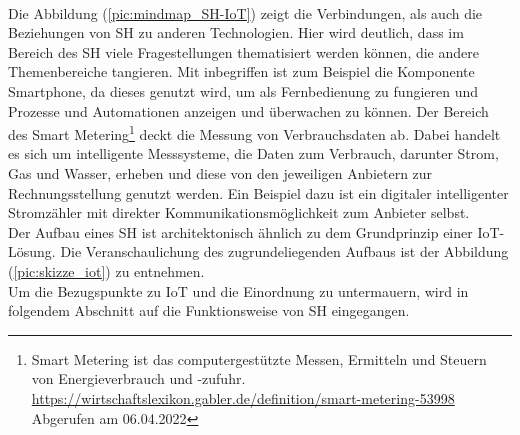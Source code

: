         \\
        Die Abbildung (\ref{pic:mindmap_SH-IoT}) zeigt die Verbindungen, als auch die Beziehungen von \acl{SH} 
        zu anderen Technologien. Hier wird deutlich, dass im Bereich des \acl{SH} viele Fragestellungen 
        thematisiert werden können, die andere Themenbereiche tangieren. Mit inbegriffen ist zum Beispiel die 
        Komponente Smartphone, da dieses genutzt wird, um als Fernbedienung zu fungieren und Prozesse und 
        Automationen anzeigen und überwachen zu können. Der Bereich des Smart Metering\footnote{Smart Metering ist das computergestützte Messen, Ermitteln und Steuern von Energieverbrauch und -zufuhr. \url{https://wirtschaftslexikon.gabler.de/definition/smart-metering-53998} Abgerufen am 06.04.2022} 
        deckt die Messung von Verbrauchsdaten ab. Dabei handelt es sich um intelligente Messsysteme, die 
        Daten zum Verbrauch, darunter Strom, Gas und Wasser, erheben und diese von den jeweiligen Anbietern zur 
        Rechnungsstellung genutzt werden. Ein Beispiel dazu ist ein digitaler intelligenter Stromzähler mit 
        direkter Kommunikationsmöglichkeit zum Anbieter selbst.
        \\
        \linebreak
        Der Aufbau eines \acl{SH} ist architektonisch ähnlich zu dem Grundprinzip einer \acs{IoT}-Lösung. Die 
        Veranschaulichung des zugrundeliegenden Aufbaus ist der Abbildung (\ref{pic:skizze_iot}) zu entnehmen. 
        \\
        Um die Bezugspunkte zu \acs{IoT} und die Einordnung zu untermauern, wird in folgendem Abschnitt auf 
        die Funktionsweise von \acl{SH} eingegangen. 


